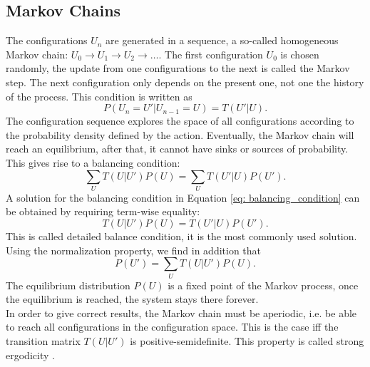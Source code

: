 \subsection{Markov Chains}
The configurations $U_n$ are generated in a sequence, a so-called homogeneous Markov chain: $U_0 \rightarrow U_1 \rightarrow U_2 \rightarrow \dots $. 
The first configuration $U_0$ is chosen randomly, the update from one configurations to the next is called the Markov step. The next configuration only depends on the present one, not one
the history of the process. This condition is written as 
\begin{equation}
    P(U_n = U'| U_{n-1} = U) = T(U'|U). 
\end{equation}
The configuration sequence explores the space of all configurations according to the probability density defined by the action. Eventually, the Markov chain will reach an equilibrium, after that, it cannot have sinks or sources of probability. This gives rise to a balancing condition: 
\begin{equation}
    \sum_U T(U|U') P(U) = \sum_U T(U'|U) P(U'). \label{eq: balancing_condition}
\end{equation}
A solution for the balancing condition in Equation \ref{eq: balancing_condition} can be obtained by requiring term-wise equality: 
\begin{equation}
    T(U|U') P(U) = T(U'|U) P(U'). 
\end{equation}
This is called detailed balance condition, it is the most commonly used solution. \\
Using the normalization property, we find in addition that 
\begin{equation}
    P(U') = \sum_U T(U|U') P(U). 
\end{equation}
The equilibrium distribution $P(U)$ is a fixed point of the Markov process, once the equilibrium is reached, the system stays there forever. \\
In order to give correct results, the Markov chain must be aperiodic, i.e. be able to reach all configurations in the configuration space. This is the case iff the transition matrix $T(U|U')$ is positive-semidefinite. This property is called strong ergodicity \cite{GattingerLang}. 
